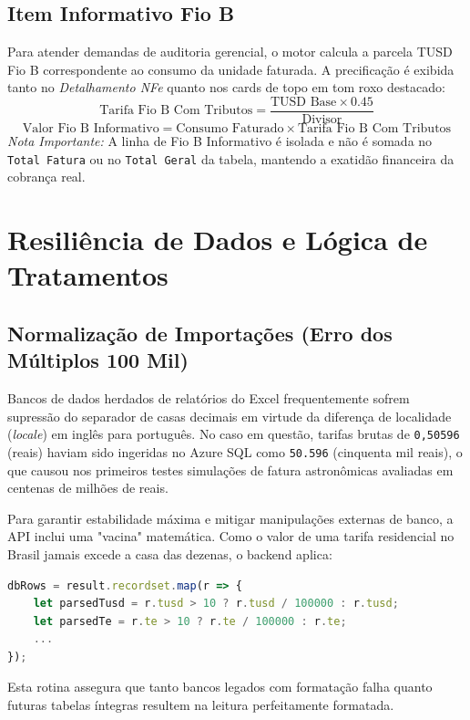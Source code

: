 \documentclass[12pt,a4paper]{article}
\begin{document}
\subsection{Item Informativo Fio B}
Para atender demandas de auditoria gerencial, o motor calcula a parcela TUSD Fio B correspondente ao consumo da unidade faturada. A precificação é exibida tanto no \textit{Detalhamento NFe} quanto nos cards de topo em tom roxo destacado:
\begin{equation}
\text{Tarifa Fio B Com Tributos} = \frac{\text{TUSD Base} \times 0.45}{\text{Divisor}}
\end{equation}
\begin{equation}
\text{Valor Fio B Informativo} = \text{Consumo Faturado} \times \text{Tarifa Fio B Com Tributos}
\end{equation}
\textit{Nota Importante:} A linha de Fio B Informativo é isolada e não é somada no \texttt{Total Fatura} ou no \texttt{Total Geral} da tabela, mantendo a exatidão financeira da cobrança real.

\section{Resiliência de Dados e Lógica de Tratamentos}

\subsection{Normalização de Importações (Erro dos Múltiplos 100 Mil)}
Bancos de dados herdados de relatórios do Excel frequentemente sofrem supressão do separador de casas decimais em virtude da diferença de localidade (\textit{locale}) em inglês para português. No caso em questão, tarifas brutas de \texttt{0,50596} (reais) haviam sido ingeridas no Azure SQL como \texttt{50.596} (cinquenta mil reais), o que causou nos primeiros testes simulações de fatura astronômicas avaliadas em centenas de milhões de reais.

Para garantir estabilidade máxima e mitigar manipulações externas de banco, a API inclui uma "vacina" matemática. Como o valor de uma tarifa residencial no Brasil jamais excede a casa das dezenas, o backend aplica:
\begin{lstlisting}[language=JavaScript]
dbRows = result.recordset.map(r => {
    let parsedTusd = r.tusd > 10 ? r.tusd / 100000 : r.tusd;
    let parsedTe = r.te > 10 ? r.te / 100000 : r.te;
    ...
});
\end{lstlisting}
Esta rotina assegura que tanto bancos legados com formatação falha quanto futuras tabelas íntegras resultem na leitura perfeitamente formatada.
\end{document}
